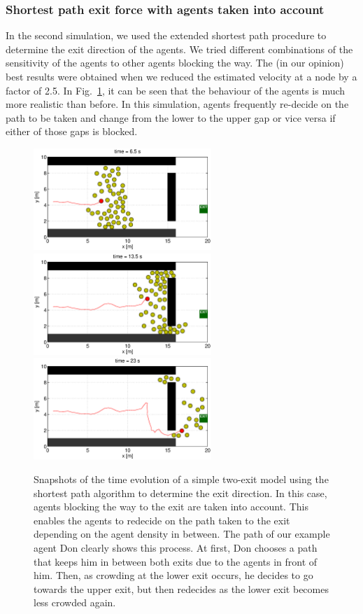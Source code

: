 \documentclass[11pt]{article}
\begin{document}
\subsubsection{Shortest path exit force with agents taken into account}
In the second simulation, we used the extended shortest path procedure to determine the exit direction of the agents. We tried different combinations of the sensitivity of the agents to other agents blocking the way. The (in our opinion) best results were obtained when we reduced the estimated velocity at a node by a factor of 2.5. In Fig.~\ref{fig:two_exits2}, it can be seen that the behaviour of the agents is much more realistic than before. In this simulation, agents frequently re-decide on the path to be taken and change from the lower to the upper gap or vice versa if either of those gaps is blocked.
\begin{figure}
	\centering
	\includegraphics[width=0.6\textwidth]{figures/TwoExitsShortestPathWithAgents_000650.eps}
	\qquad
	\includegraphics[width=0.6\textwidth]{figures/TwoExitsShortestPathWithAgents_001350.eps}
	\qquad
	\includegraphics[width=0.6\textwidth]{figures/TwoExitsShortestPathWithAgents_002300.eps}
	\caption{Snapshots of the time evolution of a simple two-exit model using the shortest path algorithm to determine the exit direction. In this case, agents blocking the way to the exit are taken into account. This enables the agents to redecide on the path taken to the exit depending on the agent density in between. The path of our example agent Don clearly shows this process. At first, Don chooses a path that keeps him in between both exits due to the agents in front of him. Then, as crowding at the lower exit occurs, he decides to go towards the upper exit, but then redecides as the lower exit becomes less crowded again.}
	\label{fig:two_exits2}
\end{figure}
\end{document}
